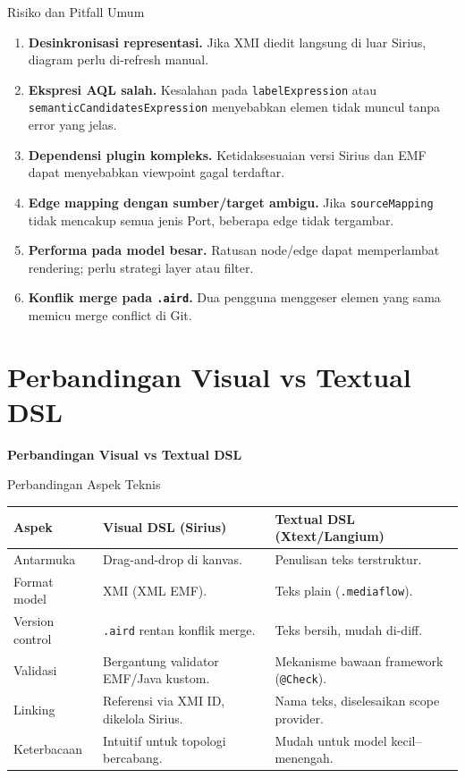 \documentclass[aspectratio=169, table]{beamer}
\begin{document}
\begin{frame}{Risiko dan Pitfall Umum}
\vspace{10pt}
\begin{enumerate}\small
  \item \textbf{Desinkronisasi representasi.} Jika XMI diedit langsung di luar Sirius, diagram perlu di-refresh manual.
  \item \textbf{Ekspresi AQL salah.} Kesalahan pada \texttt{labelExpression} atau \texttt{semanticCandidatesExpression} menyebabkan elemen tidak muncul tanpa error yang jelas.
  \item \textbf{Dependensi plugin kompleks.} Ketidaksesuaian versi Sirius dan EMF dapat menyebabkan viewpoint gagal terdaftar.
  \item \textbf{Edge mapping dengan sumber/target ambigu.} Jika \texttt{sourceMapping} tidak mencakup semua jenis Port, beberapa edge tidak tergambar.
  \item \textbf{Performa pada model besar.} Ratusan node/edge dapat memperlambat rendering; perlu strategi layer atau filter.
  \item \textbf{Konflik merge pada \texttt{.aird}.} Dua pengguna menggeser elemen yang sama memicu merge conflict di Git.
\end{enumerate}
\end{frame}

\section{Perbandingan Visual vs Textual DSL}
\begin{frame}{\hfill}
	\centering
	\Huge{\textbf{Perbandingan Visual vs Textual DSL}}
\end{frame}

\begin{frame}{Perbandingan Aspek Teknis}
\vspace{4pt}
\centering
\scriptsize
\begin{tabular}{|>{\raggedright\arraybackslash}p{}|>{\raggedright\arraybackslash}p{}|>{\raggedright\arraybackslash}p{}|}
\hline
\rowcolor{blue!12}
\textbf{Aspek} & \textbf{Visual DSL (Sirius)} & \textbf{Textual DSL (Xtext/Langium)} \\
\hline
Antarmuka & Drag-and-drop di kanvas. & Penulisan teks terstruktur. \\
\hline
Format model & XMI (XML EMF). & Teks plain (\texttt{.mediaflow}). \\
\hline
Version control & \texttt{.aird} rentan konflik merge. & Teks bersih, mudah di-diff. \\
\hline
Validasi & Bergantung validator EMF/Java kustom. & Mekanisme bawaan framework (\texttt{@Check}). \\
\hline
Linking & Referensi via XMI ID, dikelola Sirius. & Nama teks, diselesaikan scope provider. \\
\hline
Keterbacaan & Intuitif untuk topologi bercabang. & Mudah untuk model kecil--menengah. \\
\hline
\end{tabular}
\end{frame}
\end{document}
